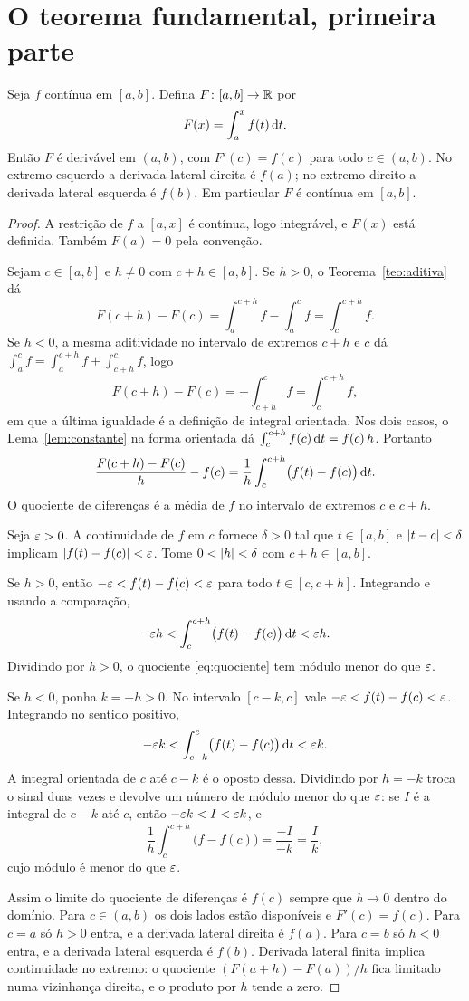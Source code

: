 \documentclass[11pt,a4paper]{article}
\begin{document}
\section{O teorema fundamental, primeira parte}

\begin{teorema}\label{teo:tfc1}
Seja $f$ contínua em $[a,b]$. Defina $F\colon[a,b]\to\mathbb{R}$ por
\[
F(x)=\int_a^x f(t)\,\mathrm{d} t.
\]
Então $F$ é derivável em $(a,b)$, com $F'(c)=f(c)$ para todo $c\in(a,b)$. No extremo esquerdo a derivada lateral direita é $f(a)$; no extremo direito a derivada lateral esquerda é $f(b)$. Em particular $F$ é contínua em $[a,b]$.
\end{teorema}

\begin{proof}
A restrição de $f$ a $[a,x]$ é contínua, logo integrável, e $F(x)$ está definida. Também $F(a)=0$ pela convenção.

Sejam $c\in[a,b]$ e $h\neq 0$ com $c+h\in[a,b]$. Se $h>0$, o Teorema~\ref{teo:aditiva} dá
\[
F(c+h)-F(c)=\int_a^{c+h}f-\int_a^c f=\int_c^{c+h}f.
\]
Se $h<0$, a mesma aditividade no intervalo de extremos $c+h$ e $c$ dá $\int_a^c f=\int_a^{c+h}f+\int_{c+h}^c f$, logo
\[
F(c+h)-F(c)=-\int_{c+h}^c f=\int_c^{c+h}f,
\]
em que a última igualdade é a definição de integral orientada. Nos dois casos, o Lema~\ref{lem:constante} na forma orientada dá $\int_c^{c+h}f(c)\,\mathrm{d} t=f(c)\,h$. Portanto
\begin{equation}
\label{eq:quociente}
\frac{F(c+h)-F(c)}{h}-f(c)
=\frac{1}{h}\int_c^{c+h}\bigl(f(t)-f(c)\bigr)\,\mathrm{d} t.
\end{equation}
O quociente de diferenças é a média de $f$ no intervalo de extremos $c$ e $c+h$.

Seja $\varepsilon>0$. A continuidade de $f$ em $c$ fornece $\delta>0$ tal que $t\in[a,b]$ e $\left\lvert t-c \right\rvert<\delta$ implicam $\left\lvert f(t)-f(c) \right\rvert<\varepsilon$. Tome $0<\left\lvert h \right\rvert<\delta$ com $c+h\in[a,b]$.

Se $h>0$, então $-\varepsilon<f(t)-f(c)<\varepsilon$ para todo $t\in[c,c+h]$. Integrando e usando a comparação,
\[
-\varepsilon h<\int_c^{c+h}\bigl(f(t)-f(c)\bigr)\,\mathrm{d} t<\varepsilon h.
\]
Dividindo por $h>0$, o quociente \eqref{eq:quociente} tem módulo menor do que $\varepsilon$.

Se $h<0$, ponha $k=-h>0$. No intervalo $[c-k,c]$ vale $-\varepsilon<f(t)-f(c)<\varepsilon$. Integrando no sentido positivo,
\[
-\varepsilon k<\int_{c-k}^c\bigl(f(t)-f(c)\bigr)\,\mathrm{d} t<\varepsilon k.
\]
A integral orientada de $c$ até $c-k$ é o oposto dessa. Dividindo por $h=-k$ troca o sinal duas vezes e devolve um número de módulo menor do que $\varepsilon$: se $I$ é a integral de $c-k$ até $c$, então $-\varepsilon k<I<\varepsilon k$, e
\[
\frac{1}{h}\int_c^{c+h}\bigl(f-f(c)\bigr)=\frac{-I}{-k}=\frac{I}{k},
\]
cujo módulo é menor do que $\varepsilon$.

Assim o limite do quociente de diferenças é $f(c)$ sempre que $h\to 0$ dentro do domínio. Para $c\in(a,b)$ os dois lados estão disponíveis e $F'(c)=f(c)$. Para $c=a$ só $h>0$ entra, e a derivada lateral direita é $f(a)$. Para $c=b$ só $h<0$ entra, e a derivada lateral esquerda é $f(b)$. Derivada lateral finita implica continuidade no extremo: o quociente $(F(a+h)-F(a))/h$ fica limitado numa vizinhança direita, e o produto por $h$ tende a zero.
\end{proof}
\end{document}
